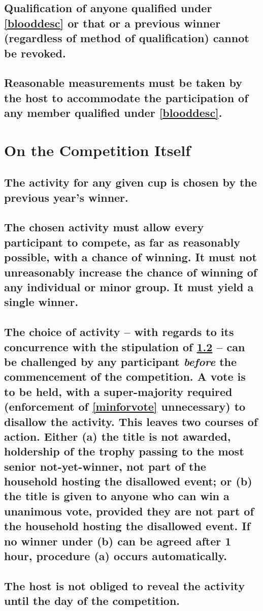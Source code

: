 \documentclass[a4paper]{article}
\begin{document}
\subsection{Qualification of anyone qualified under \ref{blooddesc} or that or a previous winner (regardless of method of qualification) cannot be revoked.}
\subsection{Reasonable measurements must be taken by the host to accommodate the participation of any member qualified under \ref{blooddesc}.}


\newpage
\section{On the Competition Itself}
\subsection{The activity for any given cup is chosen by the previous year's winner.}
\subsection{The chosen activity must allow every participant to compete, as far as reasonably possible, with a chance of winning. It must not unreasonably increase the chance of winning of any individual or minor group. It must yield a single winner.}\label{choiceofact}

\subsection{The choice of activity – with regards to its concurrence with the stipulation of \ref{choiceofact} – can be challenged by any participant \emph{before} the commencement of the competition. A vote is to be held, with a super-majority required (enforcement of \ref{minforvote} unnecessary) to disallow the activity.  This leaves two courses of action. Either (a) the title is not awarded, holdership of the trophy passing to the most senior not-yet-winner, not part of the household hosting the disallowed event; or (b) the title is given to anyone who can win a unanimous vote, provided they are not part of the household hosting the disallowed event. If no winner under (b) can be agreed after 1 hour, procedure (a) occurs automatically.}\label{choiceofactdispute}

\subsection{The host is not obliged to reveal the activity until the day of the competition.}
\end{document}

